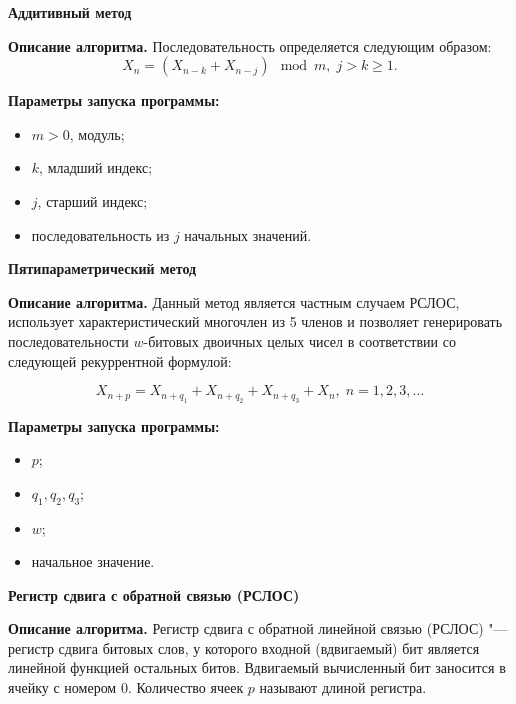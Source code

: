 \documentclass[spec, och, labwork]{shiza}
\begin{document}
\begin{center}
  \textbf{Аддитивный метод}
\end{center}

\textbf{Описание алгоритма.} Последовательность определяется следующим образом:
\begin{equation}
  X_n = (X_{n - k} + X_{n - j}) \mod m, \; j > k \geq 1.
\end{equation}

\textbf{Параметры запуска программы:}
\begin{itemize}
  \item $m > 0$, модуль;
  \item $k$, младший индекс;
  \item $j$, старший индекс;
  \item последовательность из $j$ начальных значений.
\end{itemize}

\begin{center}
  \textbf{Пятипараметрический метод}
\end{center}

\textbf{Описание алгоритма.} Данный метод является частным случаем РСЛОС, использует характеристический многочлен из 5 членов и позволяет генерировать последовательности $w$-битовых двоичных целых чисел в соответствии со следующей рекуррентной 
формулой:

\begin{equation}
  X_{n + p} = X_{n + q_1} + X_{n + q_2} + X_{n + q_3} + X_n, \; n = 1, 2, 3, \dots
\end{equation}

\textbf{Параметры запуска программы:}
\begin{itemize}
  \item $p$;
  \item $q_1, q_2, q_3$;
  \item $w$;
  \item начальное значение.
\end{itemize}

\begin{center}
  \textbf{Регистр сдвига с обратной связью (РСЛОС)}
\end{center}

\textbf{Описание алгоритма.} Регистр сдвига с обратной линейной связью (РСЛОС) "--- регистр сдвига битовых слов, у которого входной (вдвигаемый) бит является линейной функцией остальных битов. Вдвигаемый вычисленный бит заносится в 
ячейку с номером 0. Количество ячеек $p$ называют длиной регистра.
\end{document}
